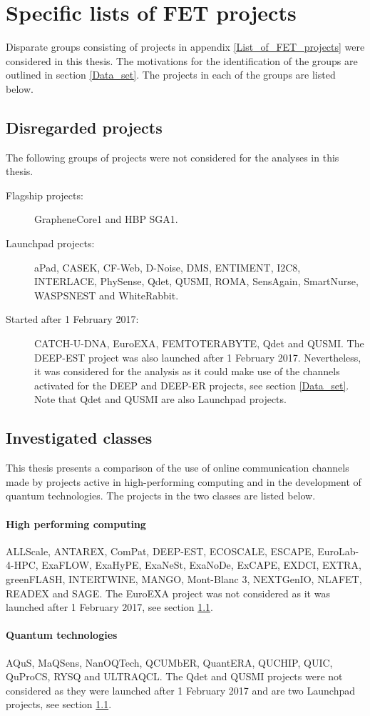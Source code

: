 \chapter{Specific lists of FET projects} \label{Specific_lists_of_FET_projects}
Disparate groups consisting of projects in appendix \ref{List_of_FET_projects} were considered in this thesis. The motivations for the identification of the groups are outlined in section \ref{Data_set}. The projects in each of the groups are listed below.

\section{Disregarded projects} \label{Disregarded_projects}
The following groups of projects were not considered for the analyses in this thesis.

\begin{description}
 \item [Flagship projects:] GrapheneCore1 and HBP SGA1.
 \item [Launchpad projects:] aPad, CASEK, CF-Web, D-Noise, DMS, ENTIMENT, I2C8, INTERLACE, PhySense, Qdet, QUSMI, ROMA, SensAgain, SmartNurse, WASPSNEST and WhiteRabbit.
 \item [Started after 1 February 2017:] CATCH-U-DNA, EuroEXA, FEMTOTERABYTE, Qdet and QUSMI. The DEEP-EST project was also launched after 1 February 2017. Nevertheless, it was considered for the analysis as it could make use of the channels activated for the DEEP and DEEP-ER projects, see section \ref{Data_set}. Note that Qdet and QUSMI are also Launchpad projects. 
\end{description}

\section{Investigated classes}
This thesis presents a comparison of the use of online communication channels made by projects active in high-performing computing and in the development of quantum technologies. The projects in the two classes are listed below. 

\subsubsection{High performing computing}
ALLScale, ANTAREX, ComPat, DEEP-EST, ECOSCALE, ESCAPE, EuroLab-4-HPC, ExaFLOW, ExaHyPE, ExaNeSt, ExaNoDe, ExCAPE, EXDCI, EXTRA, greenFLASH, INTERTWINE, MANGO, Mont-Blanc 3, NEXTGenIO, NLAFET, READEX and SAGE. The  EuroEXA project was not considered as it was launched after 1 February 2017, see section \ref{Disregarded_projects}.

\subsubsection{Quantum technologies}
AQuS, MaQSens, NanOQTech, QCUMbER, QuantERA, QUCHIP, QUIC, QuProCS, RYSQ and ULTRAQCL. The Qdet and QUSMI projects were not considered as they were launched after 1 February 2017 and are two Launchpad projects, see section \ref{Disregarded_projects}.